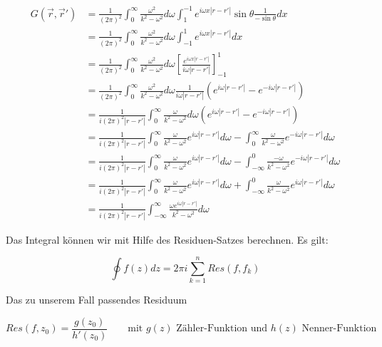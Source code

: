 \begin{align}
  \label{eq:28}
   G(\vec r ,\vec r')&= \frac{1}{(2\pi)^2} \int_0^{\infty} \frac{\omega^2}{k^2 - \omega^2 }  d\omega  \int_1^{-1} e^{i\omega x |r-r'| }  \sin\theta \frac{1}{-\sin\theta}  dx \\
 &= \frac{1}{(2\pi)^2} \int_0^{\infty} \frac{\omega^2}{k^2 -\omega^2 }  d\omega  \int_{-1}^{1} e^{i\omega x |r-r'| }   dx \\
&= \frac{1}{(2\pi)^2} \int_0^{\infty} \frac{\omega^2}{k^2 -\omega^2 }  d\omega \left[ \frac{ e^{i\omega x |r-r'| }}{i\omega |r-r'|  }   \right]_{-1}^{1} \\
&= \frac{1}{(2\pi)^2} \int_0^{\infty} \frac{\omega^2}{k^2 -\omega^2 }  d\omega  \frac{1}{i\omega |r-r'|  }  \left( e^{i\omega |r-r'| }- e^{-i\omega |r-r'| } \right) \\
&=  \frac{1}{i (2\pi)^2 |r-r'|  } \int_0^{\infty} \frac{\omega}{k^2 -\omega^2 }  d\omega   \left( e^{i\omega |r-r'| }- e^{-i\omega |r-r'| } \right) \\
&=  \frac{1}{i (2\pi)^2 |r-r'|  } \int_0^{\infty} \frac{\omega}{k^2 -\omega^2 }   e^{i\omega |r-r'| } d\omega - \int_0^{\infty} \frac{\omega}{k^2 -\omega^2 }  e^{-i\omega |r-r'| }d\omega  \\
&=  \frac{1}{i (2\pi)^2 |r-r'|  } \int_0^{\infty} \frac{\omega}{k^2 -\omega^2 }   e^{i\omega |r-r'| } d\omega - \int^0_{-\infty} \frac{-\omega}{k^2 -\omega^2 }  e^{-i\omega |r-r'| }d\omega  \\
&=  \frac{1}{i (2\pi)^2 |r-r'|  } \int_0^{\infty} \frac{\omega}{k^2 -\omega^2 }   e^{i\omega |r-r'| } d\omega + \int^0_{-\infty} \frac{\omega}{k^2 -\omega^2 }  e^{i\omega |r-r'| }d\omega  \\
&=  \frac{1}{i (2\pi)^2 |r-r'|  } \int_{-\infty}^{\infty} \frac{\omega e^{i\omega |r-r'| } }{k^2 -\omega^2 }  d\omega  
\end{align}


Das Integral können wir mit Hilfe des Residuen-Satzes berechnen. Es gilt:

\begin{equation}
  \label{eq:29}
  \oint f(z) dz = 2\pi i\sum_{k=1}^n Res(f,f_k)
\end{equation}

Das zu unserem Fall passendes Residuum

\begin{equation}
  \label{eq:30}
  Res(f,z_0) = \frac{g(z_0)}{h'(z_0)} \qquad \text{mit } g(z) \text{ Zähler-Funktion und } h(z) \text{ Nenner-Funktion} 
\end{equation}

